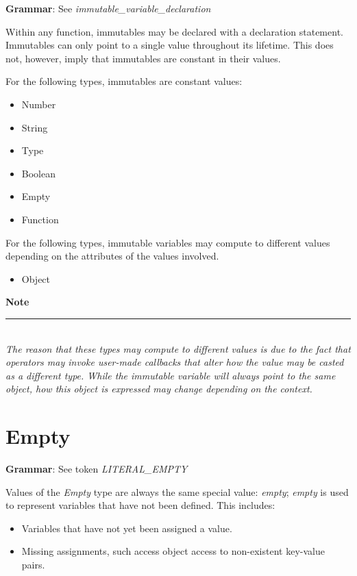 \documentclass[12pt,letterpaper]{report}
\newcommand{\noteline}{\noindent\textbf{Note}\\\noindent\rule{5cm}{0.4pt}\\}
\begin{document}
\textbf{Grammar}: See \textit{immutable\_variable\_declaration}


Within any function, immutables may be declared with a declaration statement.
Immutables can only point to a single value throughout its lifetime. This does not, however,
imply that immutables are constant in their values. 

For the following types, immutables are constant values:
\begin{itemize}
  \item Number 
  \item String 
  \item Type
  \item Boolean
  \item Empty 
  \item Function  
\end{itemize}

For the following types, immutable variables may compute to different values depending on the attributes of the values involved.
\begin{itemize}
  \item Object 
\end{itemize}





\noteline
\textit{
The reason that these types may compute to different values is due to the fact that operators may invoke user-made callbacks that 
alter how the value may be casted as a different type. While the immutable variable will always point to 
the same object, how this object is expressed may change depending on the context.
}





\section{Empty}\label{Empty}

\textbf{Grammar}: See token \textit{LITERAL\_EMPTY}


Values of the \textit{Empty} type are always the same special value: \textit{empty};
\textit{empty} is used to represent variables that have not been defined. This includes:

\begin{itemize}
  \item Variables that have not yet been assigned a value.
  \item Missing assignments, such access object access to non-existent key-value pairs.
\end{itemize}
\end{document}
